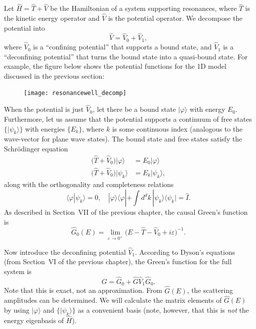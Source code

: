 \documentclass[pra,12pt]{revtex4}
\begin{document}
Let $\hat{H} = \hat{T} + \hat{V}$ be the Hamiltonian of a system
supporting resonances, where $\hat{T}$ is the kinetic energy operator
and $\hat{V}$ is the potential operator.  We decompose the potential
into
\begin{equation}
  \hat{V} = \hat{V}_0 + \hat{V}_1,
\end{equation}
where $\hat{V}_0$ is a ``confining potential'' that supports a bound
state, and $\hat{V}_1$ is a ``deconfining potential'' that turns the
bound state into a quasi-bound state.  For example, the figure below
shows the potential functions for the 1D model discussed in the
previous section:

\begin{figure}[h]
  \centering\texttt{[image: resonancewell\_decomp]}
\end{figure}

When the potential is just $\hat{V}_0$, let there be a bound state
$|\varphi\rangle$ with energy $E_0$.  Furthermore, let us assume that
the potential supports a continuum of free states $\{|\psi_k\rangle\}$
with energies $\{E_k\}$, where $k$ is some continuous index (analogous
to the wave-vector for plane wave states).  The bound state and free
states satisfy the Schr\"odinger equation
\begin{align}
  \big(\hat{T} + \hat{V}_0\big) |\varphi\rangle \; &= E_0 |\varphi\rangle \\ \big(\hat{T} + \hat{V}_0\big) |\psi_k\rangle &= E_k |\psi_k\rangle,
\end{align}
along with the orthogonality and completeness relations
\begin{equation}
  \langle\varphi|\psi_k\rangle = 0, \quad |\varphi\rangle\langle\varphi| + \int d^dk\, |\psi_k\rangle\langle\psi_k| = \hat{I}.
\end{equation}
As described in Section~VII of the previous chapter, the causal
Green's function is
\begin{equation}
  \hat{G}_0(E) = \lim_{\varepsilon\rightarrow0^+} \Big(E - \hat{T} - \hat{V}_0 + i\varepsilon\Big)^{-1}.
\end{equation}

Now introduce the deconfining potential $\hat{V}_1$.  According to
Dyson's equations (from Section~VI of the previous chapter), the
Green's function for the full system is
\begin{equation}
  \hat{G} = \hat{G}_0 + \hat{G} \hat{V}_1 \hat{G}_0.
\end{equation}
Note that this is exact, not an approximation.  From $\hat{G}(E)$, the
scattering amplitudes can be determined.  We will calculate the matrix
elements of $\hat{G}(E)$ by using $|\varphi\rangle$ and
$\{|\psi_k\rangle\}$ as a convenient basis (note, however, that this
is \textit{not} the energy eigenbasis of $\hat{H}$).
\end{document}
